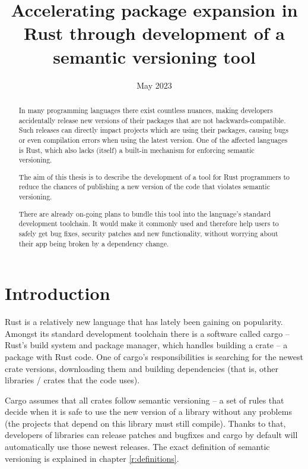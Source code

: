 \documentclass[licencjacka,en]{pracamgr}
\title{Accelerating package expansion in Rust through development of a semantic versioning tool}
\date{May 2023}
\begin{document}
\maketitle

\begin{abstract}
In many programming languages there exist countless nuances,
making developers accidentally release new versions of their packages
that are not backwards-compatible.
Such releases can directly impact projects which are using their packages,
causing bugs or even compilation errors when using the latest version.
One of the affected languages is Rust,
which also lacks (itself) a built-in mechanism for enforcing semantic versioning.

The aim of this thesis is to describe the development of a tool
for Rust programmers to reduce the chances of publishing
a new version of the code that violates semantic versioning.

There are already on-going plans to bundle this tool
into the language's standard development toolchain.
It would make it commonly used and therefore help users to safely get bug fixes,
security patches and new functionality,
without worrying about their app being broken by a dependency change.
\end{abstract}

\tableofcontents




\chapter*{Introduction}

Rust is a relatively new language that has lately been gaining on popularity.
Amongst its standard development toolchain there is a software called cargo 
-- Rust's build system and package manager,
which handles building a crate -- a package with Rust code.
One of cargo's responsibilities is searching for the newest crate versions,
downloading them and building dependencies
(that is, other libraries / crates that the code uses).

Cargo assumes that all crates follow semantic versioning
-- a set of rules that decide when it is safe to use the new version of a library
without any problems (the projects that depend on this library must still compile).
Thanks to that, developers of libraries can release patches and bugfixes
and cargo by default will automatically use those newest releases.
The exact definition of semantic versioning is explained in chapter \ref{r:definitions}.
\end{document}
